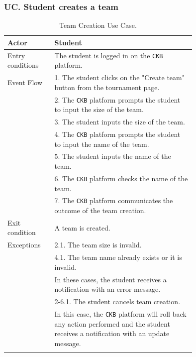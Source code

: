 \subsubsection*{UC\cuc . Student creates a team}
\begin{center}
    \begin{longtable}{lp{0.75\linewidth}}
        \hline
        Actor            & Student                                                                                                                                                                               \\
        \hline
        Entry conditions & The student is logged in on the \verb|CKB| platform.                                                                                                               \\
        \hline
        Event Flow       
        & 1. The student clicks on the "Create team" button from the tournament page.\\
        & 2. The \verb|CKB| platform prompts the student to input the size of the team.\\
        & 3. The student inputs the size of the team.\\
        & 4. The \verb|CKB| platform prompts the student to input the name of the team.\\
        & 5. The student inputs the name of the team.\\
        & 6. The \verb|CKB| platform checks the name of the team.\\
        & 7. The \verb|CKB| platform communicates the outcome of the team creation.\\
        \hline
        Exit condition   & A team is created.   \\                                                                                                                                                                           
        \hline
        Exceptions   
        & 2.1. The team size is invalid.\\                                          
        & 4.1. The team name already exists or it is invalid. \\                                                                                                         
            & In these cases, the student receives a notification with an error message.   \\
        & 2-6.1. The student cancels team creation.\\
            & In this case, the \verb|CKB| platform will roll back any action performed and the student receives a notification with an update message.\\                                                               
        \hline
        \caption{Team Creation Use Case.}
        \label{tab: team_creation_use_case}
    \end{longtable}


\end{center}
